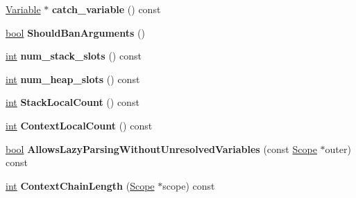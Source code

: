 \begin{DoxyCompactItemize}
\item 
\mbox{\label{classv8_1_1internal_1_1Scope_a6b758a4a4802851600398df60550f340}} 
\mbox{\hyperlink{classv8_1_1internal_1_1Variable}{Variable}} $\ast$ {\bfseries catch\+\_\+variable} () const
\item 
\mbox{\label{classv8_1_1internal_1_1Scope_afdb92a9e8bbb08757f3d84f71bb90194}} 
\mbox{\hyperlink{classbool}{bool}} {\bfseries Should\+Ban\+Arguments} ()
\item 
\mbox{\label{classv8_1_1internal_1_1Scope_ac371c188d72ff2484deda5ba6054a340}} 
\mbox{\hyperlink{classint}{int}} {\bfseries num\+\_\+stack\+\_\+slots} () const
\item 
\mbox{\label{classv8_1_1internal_1_1Scope_a029432141544c8bcb0342dcdb05a0b2e}} 
\mbox{\hyperlink{classint}{int}} {\bfseries num\+\_\+heap\+\_\+slots} () const
\item 
\mbox{\label{classv8_1_1internal_1_1Scope_afae5caa09780e970cde25bed78223fce}} 
\mbox{\hyperlink{classint}{int}} {\bfseries Stack\+Local\+Count} () const
\item 
\mbox{\label{classv8_1_1internal_1_1Scope_a002199ffdb31822ef1487905be8a0ed8}} 
\mbox{\hyperlink{classint}{int}} {\bfseries Context\+Local\+Count} () const
\item 
\mbox{\label{classv8_1_1internal_1_1Scope_a1e78e29e5b36371d2d0a3102cbbb69d5}} 
\mbox{\hyperlink{classbool}{bool}} {\bfseries Allows\+Lazy\+Parsing\+Without\+Unresolved\+Variables} (const \mbox{\hyperlink{classv8_1_1internal_1_1Scope}{Scope}} $\ast$outer) const
\item 
\mbox{\label{classv8_1_1internal_1_1Scope_a3b204afa0928e9f3c1d552c632d315c8}} 
\mbox{\hyperlink{classint}{int}} {\bfseries Context\+Chain\+Length} (\mbox{\hyperlink{classv8_1_1internal_1_1Scope}{Scope}} $\ast$scope) const
\item 
\mbox{\label{classv8_1_1internal_1_1Scope_ac4dad5d5b1e9c044d896d9cfbdf2eea2}} 

\end{DoxyCompactItemize}
